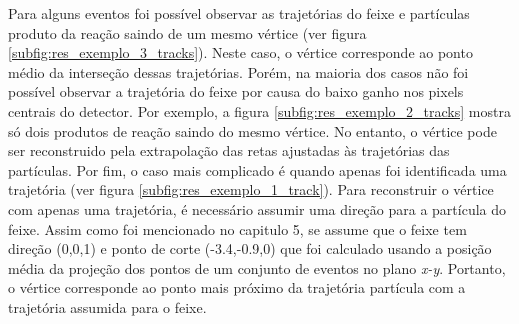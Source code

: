 \documentclass[a4paper,12pt,oneside]{book}
\begin{document}
\par Para alguns eventos foi possível observar as trajetórias do feixe e partículas produto da reação saindo de um mesmo vértice (ver figura \ref{subfig:res_exemplo_3_tracks}). Neste caso, o vértice corresponde ao ponto médio da interseção dessas trajetórias. Porém, na maioria dos casos não foi possível observar a trajetória do feixe por causa do baixo ganho nos pixels centrais do detector. Por exemplo, a figura \ref{subfig:res_exemplo_2_tracks} mostra só dois produtos de reação saindo do mesmo vértice. No entanto, o vértice pode ser reconstruido pela extrapolação das retas ajustadas às trajetórias das partículas. Por fim, o caso mais complicado é quando apenas foi identificada uma trajetória (ver figura \ref{subfig:res_exemplo_1_track}). Para reconstruir o vértice com apenas uma trajetória, é necessário assumir uma direção para a partícula do feixe. Assim como foi mencionado no capitulo 5, se assume que o feixe tem direção (0,0,1) e ponto de corte (-3.4,-0.9,0) que foi calculado usando a posição média da projeção dos pontos de um conjunto de eventos no plano \textit{x-y}. Portanto, o vértice corresponde ao ponto mais próximo da trajetória partícula com a trajetória assumida para o feixe.
\end{document}
